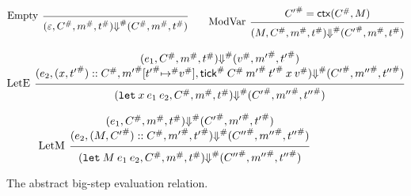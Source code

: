 \documentclass[acmsmall,review]{acmart}\settopmatter{printfolios=true,printccs=false,printacmref=false}
\theoremstyle{definition}
\newcommand*{\cons}{::}
\newcommand*{\A}[1]{{#1}^{\#}}
\newcommand*{\mem}{m}
\newcommand*{\tick}{\mathsf{tick}}
\newcommand*{\modctx}{\mathsf{ctx}}
\begin{document}
\begin{figure}[h!]
  \[
    \begin{prooftree}
      \infer[left label=Empty]0{
      (\varepsilon, \A{C}, \A{\mem}, \A{t})
      \A{\Downarrow}
      (\A{C}, \A{\mem}, \A{t})
      }
    \end{prooftree}\qquad
    \begin{prooftree}
      \hypo{\A{C'}=\modctx(\A{C},M)}
      \infer[left label=ModVar]1{
      (M, \A{C}, \A{\mem}, \A{t})
      \A{\Downarrow}
      (\A{C'}, \A{\mem}, \A{t})
      }
    \end{prooftree}
  \]

  \[
    \begin{prooftree}
      \hypo{
        \begin{matrix}
          (e_{1}, \A{C}, \A{\mem}, \A{t})
          \A\Downarrow
          (\A{v}, \A{\mem'}, \A{t'}) \\
          (e_{2}, (x, \A{t'})\cons \A{C}, \A{\mem'}[\A{t'}\A{\mapsto} \A{v}], \A{\tick}\:\A{C}\:\A{\mem'}\:\A{t'}\:x\:\A{v})
          \A\Downarrow
          (\A{C'}, \A{\mem''}, \A{t''})
        \end{matrix}
      }
      \infer[left label=LetE]1{
      (\mathtt{let}\:x\:e_1\:e_2, \A{C}, \A{\mem}, \A{t})
      \A\Downarrow
      (\A{C'}, \A{\mem''}, \A{t''})
      }
    \end{prooftree}
  \]

  \[
    \begin{prooftree}
      \hypo{
        \begin{matrix}
          (e_{1}, \A{C}, \A{\mem}, \A{t})
          \A\Downarrow
          (\A{C'}, \A{\mem'}, \A{t'}) \\
          (e_{2}, (M, \A{C'})\cons\A{C}, \A{\mem'}, \A{t'})
          \A\Downarrow
          (\A{C''}, \A{\mem''}, \A{t''})
        \end{matrix}
      }
      \infer[left label=LetM]1{
      (\mathtt{let}\:M\:e_{1}\:e_{2}, \A{C}, \A{\mem}, \A{t})
      \A\Downarrow
      (\A{C''}, \A{\mem''}, \A{t''})
      }
    \end{prooftree}
  \]
  \caption{The abstract big-step evaluation relation.}
  \label{fig:abseval}
\end{figure}
\end{document}
